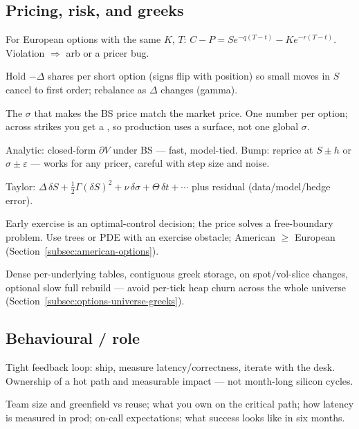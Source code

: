\subsection{Pricing, risk, and greeks}

For European options with the same $K$, $T$: 
$C - P = S e^{-q(T-t)} - K e^{-r(T-t)}$. Violation $\Rightarrow$ arb or a pricer bug.

Hold $-\Delta$ shares per short option (signs flip with position) so small moves in $S$ 
cancel to first order; rebalance as $\Delta$ changes (gamma).

The $\sigma$ that makes the BS price match the market price. One number per option; 
across strikes you get a , so production uses a surface, not one 
global $\sigma$.

Analytic: closed-form $\partial V$ under BS --- fast, model-tied. 
Bump: reprice at $S\pm h$ or $\sigma\pm\varepsilon$ --- works for any pricer, careful with 
step size and noise.

Taylor: $\Delta\,\delta S + \tfrac{1}{2}\Gamma(\delta S)^2 + \nu\,\delta\sigma + \Theta\,\delta t + \cdots$ 
plus residual (data/model/hedge error).

Early exercise is an optimal-control decision; the price solves a free-boundary 
problem. Use trees or PDE with an exercise obstacle; American $\ge$ European 
(Section~\ref{subsec:american-options}).

Dense per-underlying tables, contiguous greek storage,  
on spot/vol-slice changes, optional slow full rebuild --- avoid per-tick heap churn 
across the whole universe (Section~\ref{subsec:options-universe-greeks}).

\subsection{Behavioural / role}

Tight feedback loop: ship, measure latency/correctness, iterate with the desk. 
Ownership of a hot path and measurable impact --- not month-long silicon cycles.

Team size and greenfield vs reuse; what you own on the critical path; how latency is 
measured in prod; on-call expectations; what success looks like in six months.
